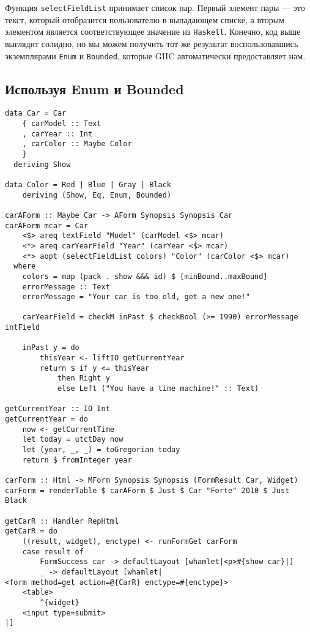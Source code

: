 Функция \lstinline'selectFieldList' принимает список пар. Первый элемент пары --- это
текст, который отобразится пользователю в выпадающем списке, а вторым элементом
является соответствующее значение из \lstinline'Haskell'. Конечно, код выше выглядит
солидно, но мы можем получить тот же результат воспользовавшись экземплярами
\lstinline'Enum' и \lstinline'Bounded', которые GHC автоматически
предоставляет нам.

\subsection{Используя Enum и Bounded}

\begin{lstlisting}
data Car = Car
    { carModel :: Text
    , carYear :: Int
    , carColor :: Maybe Color
    }
  deriving Show

data Color = Red | Blue | Gray | Black
    deriving (Show, Eq, Enum, Bounded)

carAForm :: Maybe Car -> AForm Synopsis Synopsis Car
carAForm mcar = Car
    <$> areq textField "Model" (carModel <$> mcar)
    <*> areq carYearField "Year" (carYear <$> mcar)
    <*> aopt (selectFieldList colors) "Color" (carColor <$> mcar)
  where
    colors = map (pack . show &&& id) $ [minBound..maxBound]
    errorMessage :: Text
    errorMessage = "Your car is too old, get a new one!"

    carYearField = checkM inPast $ checkBool (>= 1990) errorMessage intField

    inPast y = do
        thisYear <- liftIO getCurrentYear
        return $ if y <= thisYear
            then Right y
            else Left ("You have a time machine!" :: Text)

getCurrentYear :: IO Int
getCurrentYear = do
    now <- getCurrentTime
    let today = utctDay now
    let (year, _, _) = toGregorian today
    return $ fromInteger year

carForm :: Html -> MForm Synopsis Synopsis (FormResult Car, Widget)
carForm = renderTable $ carAForm $ Just $ Car "Forte" 2010 $ Just Black

getCarR :: Handler RepHtml
getCarR = do
    ((result, widget), enctype) <- runFormGet carForm
    case result of
        FormSuccess car -> defaultLayout [whamlet|<p>#{show car}|]
        _ -> defaultLayout [whamlet|
<form method=get action=@{CarR} enctype=#{enctype}>
    <table>
        ^{widget}
    <input type=submit>
|]
\end{lstlisting}

